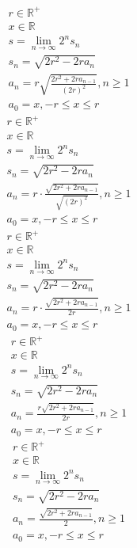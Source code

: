 \documentclass[a4paper,12pt]{report}
\begin{document}
\begin{subequations}
\begin{gather}
r \in \mathbb{R}^+ \\
x \in \mathbb{R} \\
s = \lim \limits_{n \to \infty} 2^n s_n \\
s_n = \sqrt{2r^2 - 2ra_n} \\
a_n = r \sqrt{\frac{2r^2 + 2ra_{n-1}}{(2r)^2}}, n \geq 1 \\
a_0 = x, -r \leq x \leq r
\end{gather}
\end{subequations}
\begin{subequations}
\begin{gather}
r \in \mathbb{R}^+ \\
x \in \mathbb{R} \\
s = \lim \limits_{n \to \infty} 2^n s_n \\
s_n = \sqrt{2r^2 - 2ra_n} \\
a_n = r \cdot \frac{\sqrt{2r^2 + 2ra_{n-1}}}{\sqrt{(2r)^2}}, n \geq 1 \\
a_0 = x, -r \leq x \leq r
\end{gather}
\end{subequations}
\begin{subequations}
\begin{gather}
r \in \mathbb{R}^+ \\
x \in \mathbb{R} \\
s = \lim \limits_{n \to \infty} 2^n s_n \\
s_n = \sqrt{2r^2 - 2ra_n} \\
a_n = r \cdot \frac{\sqrt{2r^2 + 2ra_{n-1}}}{2r}, n \geq 1 \\
a_0 = x, -r \leq x \leq r
\end{gather}
\end{subequations}
\begin{subequations}
\begin{gather}
r \in \mathbb{R}^+ \\
x \in \mathbb{R} \\
s = \lim \limits_{n \to \infty} 2^n s_n \\
s_n = \sqrt{2r^2 - 2ra_n} \\
a_n = \frac{r \sqrt{2r^2 + 2ra_{n-1}}}{2r}, n \geq 1 \\
a_0 = x, -r \leq x \leq r
\end{gather}
\end{subequations}
\begin{subequations}
\begin{gather}
r \in \mathbb{R}^+ \\
x \in \mathbb{R} \\
s = \lim \limits_{n \to \infty} 2^n s_n \\
s_n = \sqrt{2r^2 - 2ra_n} \\
a_n = \frac{\sqrt{2r^2 + 2ra_{n-1}}}{2}, n \geq 1 \\
a_0 = x, -r \leq x \leq r
\end{gather}
\end{subequations}
\end{document}
